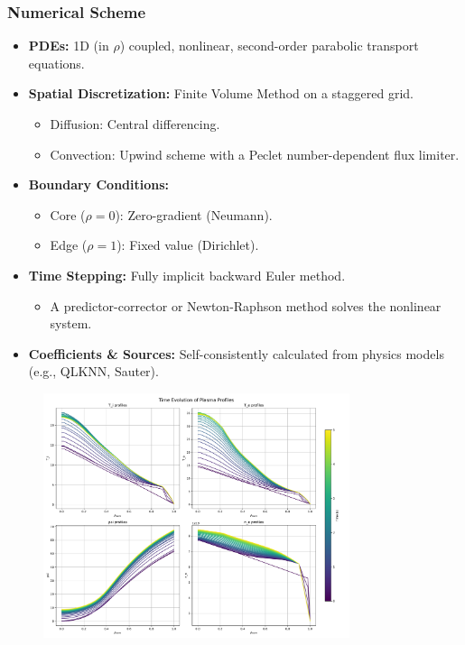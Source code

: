 \documentclass[10pt,aspectratio=169]{beamer}
\begin{document}
\begin{frame}
  \frametitle{Numerical Scheme}
  \begin{itemize}
    \item \textbf{PDEs:} 1D (in $\rho$) coupled, nonlinear, second-order parabolic transport equations.
    \item \textbf{Spatial Discretization:} Finite Volume Method on a staggered grid.
    \begin{itemize}
        \item Diffusion: Central differencing.
        \item Convection: Upwind scheme with a Peclet number-dependent flux limiter.
    \end{itemize}
    \item \textbf{Boundary Conditions:}
    \begin{itemize}
        \item Core ($\rho=0$): Zero-gradient (Neumann).
        \item Edge ($\rho=1$): Fixed value (Dirichlet).
    \end{itemize}
    \item \textbf{Time Stepping:} Fully implicit backward Euler method.
    \begin{itemize}
        \item A predictor-corrector or Newton-Raphson method solves the nonlinear system.
    \end{itemize}
    \item \textbf{Coefficients \& Sources:} Self-consistently calculated from physics models (e.g., QLKNN, Sauter).
  \end{itemize}
\end{frame}

\begin{frame}[plain]
  \begin{figure}
    \includegraphics[width=0.8\textwidth]{all_profiles.pdf}
  \end{figure}
\end{frame}

\begin{frame}[allowframebreaks]
  
  
  \nocite{*}
\end{frame}
\end{document}
